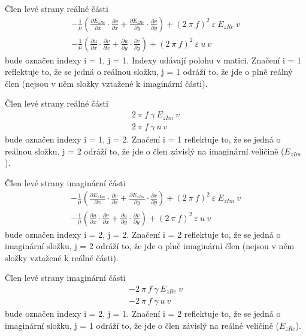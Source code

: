\documentclass[12pt,a4paper,oneside]{article}
\numberwithin{equation}{section} %
\numberwithin{figure}{section} %
\numberwithin{table}{section} %
\begin{document}
Člen levé strany reálné části
\begin{subequations}
\begin{gather}
- \frac{1}{\mu} \left( \frac{\partial E _{zRe}}{\partial x} \cdot \frac{\partial v}{\partial x} + \frac{\partial E _{zRe}}{\partial y} \cdot \frac{\partial v}{\partial y} \right) + (2 ~ \pi ~ f) ^2 ~ \varepsilon ~ E _{zRe} ~ v
\\
- \frac{1}{\mu} \left( \frac{\partial u}{\partial x} \cdot \frac{\partial v}{\partial x} + \frac{\partial u}{\partial y} \cdot \frac{\partial v}{\partial y} \right) + (2 ~ \pi ~ f) ^2  ~ \varepsilon ~ u ~ v
\end{gather}
\end{subequations}
bude označen indexy i = 1, j = 1. Indexy udávají polohu v matici. Značení i = 1 reflektuje to, že se jedná o reálnou složku, j = 1 odráží to, že jde o plně reálný člen (nejsou v něm složky vztažené k imaginární části). 

Člen levé strany reálné části
\begin{subequations}
\begin{gather}
2 ~ \pi ~ f ~ \gamma ~ E _{zIm} ~ v
\\
2 ~ \pi ~ f ~ \gamma ~ u ~ v
\end{gather}
\end{subequations}
bude označen indexy i = 1, j = 2. Značení i = 1 reflektuje to, že se jedná o reálnou složku, j = 2 odráží to, že jde o člen závislý na imaginární veličině ($E _{zIm}$).


Člen levé strany imaginární části
\begin{subequations}
\begin{gather}
- \frac{1}{\mu} \left( \frac{\partial E _{zIm}}{\partial x} \cdot \frac{\partial v}{\partial x} + \frac{\partial E _{zIm}}{\partial y} \cdot \frac{\partial v}{\partial y} \right) + (2 ~ \pi ~ f) ^2 ~ \varepsilon ~ E _{zIm} ~ v
\\
- \frac{1}{\mu} \left( \frac{\partial u}{\partial x} \cdot \frac{\partial v}{\partial x} + \frac{\partial u}{\partial y} \cdot \frac{\partial v}{\partial y} \right) + (2 ~ \pi ~ f) ^2 ~ \varepsilon ~ u ~ v
\end{gather}
\end{subequations}
bude označen indexy i = 2, j = 2. Značení i = 2 reflektuje to, že se jedná o imaginární složku, j = 2 odráží to, že jde o plně imaginární člen (nejsou v něm složky vztažené k reálné části). 

Člen levé strany imaginární části
\begin{subequations}
\begin{gather}
- 2 ~ \pi ~ f ~ \gamma ~ E _{zRe} ~ v
\\
- 2 ~ \pi ~ f ~ \gamma ~ u ~ v
\end{gather}
\end{subequations}
bude označen indexy i = 2, j = 1. Značení i = 2 reflektuje to, že se jedná o imaginární složku, j = 1 odráží to, že jde o člen závislý na reálné veličině ($E _{zRe}$).
\end{document}
